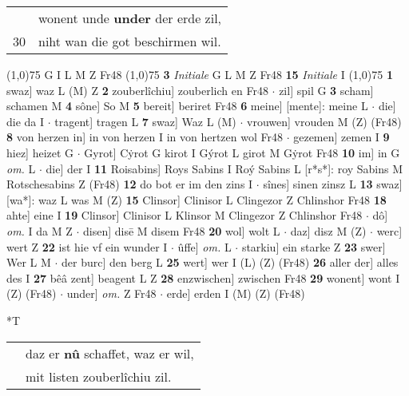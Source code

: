 \documentclass[8pt,a4paper,notitlepage]{article}
\begin{document}
\begin{table}[ht]
\begin{minipage}[t]{0.5\linewidth}
\begin{tabular}{rl}
 & wonent unde \textbf{under} der erde zil,\\ 
30 & niht wan die got beschirmen wil.\\ 
\end{tabular}
\scriptsize
\line(1,0){75} \newline
G I L M Z Fr48 \newline
\line(1,0){75} \newline
\textbf{3} \textit{Initiale} G L M Z Fr48  \textbf{15} \textit{Initiale} I  \newline
\line(1,0){75} \newline
\textbf{1} swaz] waz L (M) Z \textbf{2} zouberlîchiu] zouberlich en Fr48  $\cdot$ zil] spil G \textbf{3} scham] schamen M \textbf{4} sône] So M \textbf{5} bereit] beriret Fr48 \textbf{6} meine] [mente]: meine L  $\cdot$ die] die da I  $\cdot$ tragent] tragen L \textbf{7} swaz] Waz L (M)  $\cdot$ vrouwen] vrouden M (Z) (Fr48) \textbf{8} von herzen in] in von herzen I in von hertzen wol Fr48  $\cdot$ gezemen] zemen I \textbf{9} hiez] heizet G  $\cdot$ Gyrot] Cẏrot G kirot I Gýrot L girot M Gẏrot Fr48 \textbf{10} im] in G \textit{om.} L  $\cdot$ die] der I \textbf{11} Roisabins] Roys Sabins I Roý Sabins L [r*s*]: roy Sabins M Rotschesabins Z (Fr48) \textbf{12} do bot er im den zins I  $\cdot$ sînes] sinen zinsz L \textbf{13} swaz] [wa*]: waz L was M (Z) \textbf{15} Clinsor] Clinisor L Clingezor Z Chlinshor Fr48 \textbf{18} ahte] eine I \textbf{19} Clinsor] Clinisor L Klinsor M Clingezor Z Chlinshor Fr48  $\cdot$ dô] \textit{om.} I da M Z  $\cdot$ disen] disē M disem Fr48 \textbf{20} wol] wolt L  $\cdot$ daz] disz M (Z)  $\cdot$ werc] wert Z \textbf{22} ist hie vf ein wunder I  $\cdot$ ûffe] \textit{om.} L  $\cdot$ starkiu] ein starke Z \textbf{23} swer] Wer L M  $\cdot$ der burc] den berg L \textbf{25} wert] wer I (L) (Z) (Fr48) \textbf{26} aller der] alles des I \textbf{27} bêâ zent] beagent L Z \textbf{28} enzwischen] zwischen Fr48 \textbf{29} wonent] wont I (Z) (Fr48)  $\cdot$ under] \textit{om.} Z Fr48  $\cdot$ erde] erden I (M) (Z) (Fr48) \newline
\end{minipage}
\hspace{0.5cm}
\begin{minipage}[t]{0.5\linewidth}
\small
\begin{center}*T
\end{center}
\begin{tabular}{rl}
 & daz er \textbf{nû} schaffet, waz er wil,\\ 
 & mit listen zouberlîchiu zil.\\ 

\end{tabular}
\end{minipage}
\end{table}
\end{document}
